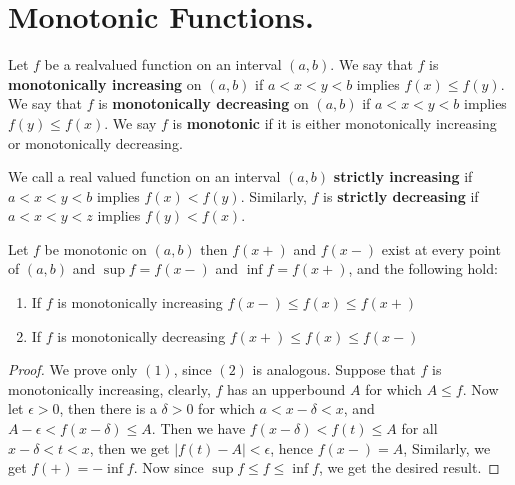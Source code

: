
\section{Monotonic Functions.}

\begin{definition}
    Let $f$ be a realvalued function on an interval  $(a,b)$. We say that  $f$ is
    \textbf{monotonically increasing} on $(a,b)$ if  $a<x<y<b$ implies  $f(x) \leq f(y)$.
    We say that  $f$ is \textbf{monotonically decreasing} on $(a,b)$ if  $a<x<y<b$
    implies  $f(y) \leq f(x)$. We say $f$ is \textbf{monotonic} if it is either
    monotonically increasing or monotonically decreasing.
\end{definition}

\begin{definition}
    We call a real valued function on an interval $(a,b)$ \textbf{strictly
    increasing} if $a<x<y<b$ implies  $f(x)<f(y)$. Similarly, $f$ is
    \textbf{strictly decreasing} if $a<x<y<z$ implies $f(y)<f(x)$.
\end{definition}

\begin{theorem}\label{5.6.1}
    Let $f$ be monotonic on $(a,b)$ then $f(x+)$ and  $f(x-)$ exist at every point of
    $(a,b)$ and $\sup{f}=f(x-)$ and  $\inf{f}=f(x+)$, and the following hold:
        \begin{enumerate}[label=(\arabic*)]
            \begin{enumerate}[label=(\arabic*)]
                \item If $f$ is monotonically increasing $f(x-) \leq f(x) \leq f(x+)$

                \item If $f$ is monotonically decreasing $f(x+) \leq f(x) \leq f(x-)$
            \end{enumerate}
        \end{enumerate}
\end{theorem}
\begin{proof}
    We prove only $(1)$, since  $(2)$ is analogous. Suppose that $f$ is monotonically
    increasing, clearly,  $f$ has an upperbound  $A$ for which  $A \leq f$. Now let  $\epsilon>0$,
    then there is a  $\delta>0$ for which  $a<x-\delta<x$, and  $A-\epsilon<f(x-\delta) \leq A$.  Then we have
    $f(x-\delta)<f(t) \leq A$ for all  $x-\delta<t<x$, then we get  $|f(t)-A|<\epsilon$, hence
    $f(x-)=A$, Similarly, we get  $f(+)=-\inf{f}$. Now since  $\sup{f} \leq f \leq \inf{f}$,
    we get the desired result.
\end{proof}

